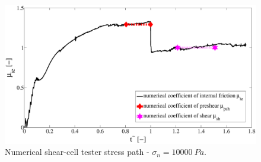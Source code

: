 \begin{figure}[!htb] 
\centering 
\includegraphics[width=.96\textwidth]{images/021simexample} 
\caption[Numerical shear cell tester stress path]{Numerical shear-cell tester
stress path - $\sigma_n = 10000 ~Pa$.}
\label{fig:021simexample} 
\end{figure}

